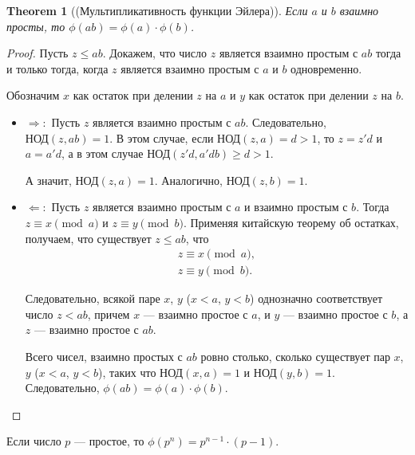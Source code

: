 \documentclass[a4paper]{article}
\theoremstyle{named}
\newtheorem*{namedtheorem}{Theorem}
\renewcommand{\gcd}{\text{НОД}}
\begin{document}
\begin{colloq}
        \begin{namedtheorem}[(Мультипликативность функции Эйлера)]
            Если $a$ и $b$ взаимно просты, то $\phi(ab) = \phi(a) \cdot \phi(b)$.
        \end{namedtheorem}

        \begin{proof}
            Пусть $z \leq ab$. Докажем, что число $z$ является взаимно простым с $ab$ тогда и только тогда, когда $z$ является взаимно простым с $a$ и $b$ одновременно.

            Обозначим $x$ как остаток при делении $z$ на $a$ и $y$ как остаток при делении $z$ на $b$.

            \begin{itemize}
            \item $\Rightarrow:$ 
                Пусть $z$ является взаимно простым с $ab$. Следовательно, $\gcd(z, ab) = 1$. В этом случае, если $\gcd(z, a) = d > 1$, то $z = z'd$ и $a = a'd$, а в этом случае $\gcd(z'd, a'db) \geq d > 1$. 
                
                А значит, $\gcd(z, a) = 1$. Аналогично, $\gcd(z, b) = 1$.

            \item $\Leftarrow:$ 
                Пусть $z$ является взаимно простым с $a$ и взаимно простым с $b$. Тогда $z \equiv x \pmod a$ и $z \equiv y \pmod b$. Применяя китайскую теорему об остатках, получаем, что существует $z \leq ab$, что
                \[\begin{gathered}
                    z \equiv x \pmod a, \\
                    z \equiv y \pmod b.
                \end{gathered}\]

                Следовательно, всякой паре $x$, $y$ ($x < a$, $y < b$) однозначно соответствует число $z < ab$, причем $x$ --- взаимно простое с $a$, и $y$ --- взаимно простое с $b$, а $z$ --- взаимно простое с $ab$.

                Всего чисел, взаимно простых с $ab$ ровно столько, сколько существует пар $x$, $y$ ($x < a$, $y < b$), таких что $\gcd(x, a) = 1$ и $\gcd(y, b) = 1$. Следовательно, $\phi(ab) = \phi(a) \cdot \phi(b)$.
            \end{itemize}
        \end{proof}

        \begin{lemma*}
            Если число $p$ --- простое, то $\phi(p^n) = p^{n - 1} \cdot (p - 1)$.
        \end{lemma*}


\end{colloq}
\end{document}
